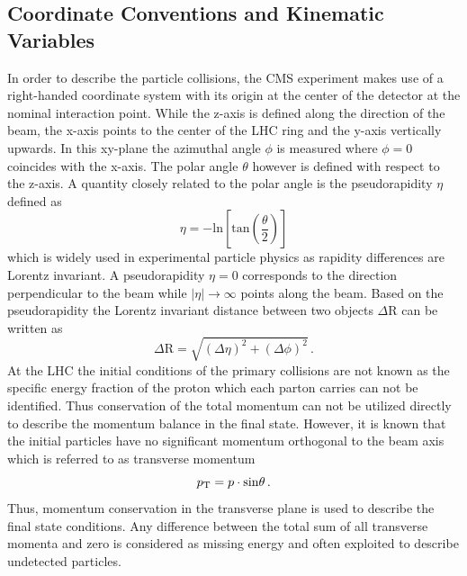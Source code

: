 \subsection{Coordinate Conventions and Kinematic Variables}
\label{subsec:cms_coordinates}
In order to describe the particle collisions, the CMS experiment makes use of a right-handed coordinate system with its origin at the center of the detector at the nominal interaction point. While the z-axis is defined along the direction of the beam, the x-axis points to the center of the LHC ring and the y-axis vertically upwards. In this xy-plane the azimuthal angle $\phi$ is measured where $\phi = 0$ coincides with the x-axis. The polar angle $\theta$ however is defined with respect to the z-axis. A quantity closely related to the polar angle is the pseudorapidity $\eta$ defined as
\begin{equation}
\eta = \mathrm{-ln} \left[\mathrm{tan} \left(\frac{\theta}{2} \right)\right]
\end{equation}
which is widely used in experimental particle physics as rapidity differences are Lorentz invariant. A pseudorapidity $\eta = 0$ corresponds to the direction perpendicular to the beam while $|\eta| \rightarrow \infty$ points along the beam. Based on the pseudorapidity the Lorentz invariant distance between two objects $\Delta$R can be written as
\begin{equation}
\Delta \mathrm{R} = \sqrt{(\Delta \eta)^2 + (\Delta \phi)^2} \, .
\end{equation}
At the LHC the initial conditions of the primary collisions are not known as the specific energy fraction of the proton which each parton carries can not be identified. Thus conservation of the total momentum can not be utilized directly to describe the momentum balance in the final state. However, it is known that the initial particles have no significant momentum orthogonal to the beam axis which is referred to as transverse momentum 
\begin{equation}
p_{\text{T}} = p \cdot \mathrm{sin}\theta \, .
\end{equation}
Thus, momentum conservation in the transverse plane is used to describe the final state conditions. Any difference between the total sum of all transverse momenta and zero is considered as missing energy \met and often exploited to describe undetected particles.

